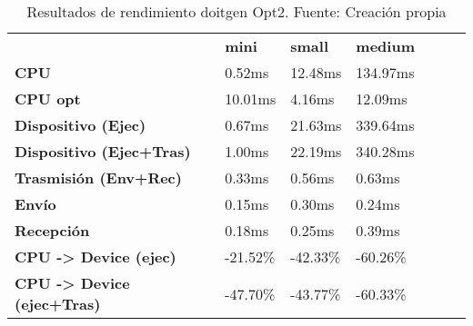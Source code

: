 \begin{table}[H]
    \centering
    \begin{tabular}{lllllll}
    \rowcolor[HTML]{DAE8FC} \ &  \textbf{mini} &  \textbf{	small} &  \textbf{	medium} \\
    \cellcolor[HTML]{DAE8FC} \textbf{CPU} & 0.52ms & 	12.48ms & 	134.97ms \\
    \rowcolor[HTML]{EFEFEF} \cellcolor[HTML]{DAE8FC} \textbf{CPU opt} & 10.01ms & 	4.16ms & 	12.09ms \\
    \cellcolor[HTML]{DAE8FC} \textbf{Dispositivo (Ejec)} & 0.67ms & 	21.63ms & 	339.64ms \\
    \rowcolor[HTML]{EFEFEF} \cellcolor[HTML]{DAE8FC} \textbf{Dispositivo (Ejec+Tras)} & 1.00ms & 	22.19ms & 	340.28ms \\
    \cellcolor[HTML]{DAE8FC} \textbf{Trasmisión (Env+Rec)} & 0.33ms & 	0.56ms & 	0.63ms \\
    \rowcolor[HTML]{EFEFEF} \cellcolor[HTML]{DAE8FC} \textbf{Envío} & 0.15ms & 	0.30ms & 	0.24ms \\
    \cellcolor[HTML]{DAE8FC} \textbf{Recepción} & 0.18ms & 	0.25ms & 	0.39ms \\
    \rowcolor[HTML]{EFEFEF} \cellcolor[HTML]{DAE8FC} \textbf{CPU -> Device (ejec)} & -21.52\% & 	-42.33\% & 	-60.26\% \\
    \cellcolor[HTML]{DAE8FC} \textbf{CPU -> Device (ejec+Tras)} & -47.70\% & 	-43.77\% & 	-60.33\% \\
    \end{tabular}
    \caption[Resultados de rendimiento doitgen Opt2]{{Resultados de rendimiento doitgen Opt2. Fuente: Creación propia}}
    \label{table_test_doitgen_Opt2_hw_performanceResults}
\end{table}